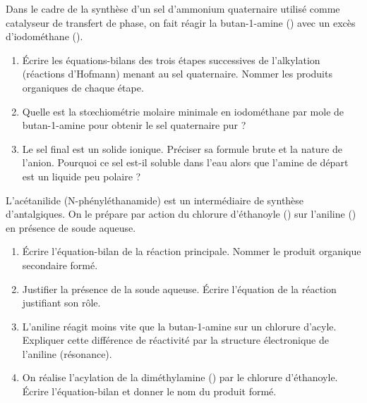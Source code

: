 \documentclass[11pt]{article}
\begin{document}
\begin{exercice}
Dans le cadre de la synthèse d'un sel d'ammonium quaternaire utilisé comme catalyseur de transfert de phase, on fait réagir la butan-1-amine () avec un excès d'iodométhane ().
\begin{enumerate}
    \item Écrire les équations-bilans des trois étapes successives de l'alkylation (réactions d'Hofmann) menant au sel quaternaire. Nommer les produits organiques de chaque étape.
    \item Quelle est la stœchiométrie molaire minimale en iodométhane par mole de butan-1-amine pour obtenir le sel quaternaire pur ?
    \item Le sel final est un solide ionique. Préciser sa formule brute et la nature de l'anion. Pourquoi ce sel est-il soluble dans l'eau alors que l'amine de départ est un liquide peu polaire ?
\end{enumerate}
\end{exercice}

\begin{exercice}
L'acétanilide (N-phényléthanamide) est un intermédiaire de synthèse d'antalgiques. On le prépare par action du chlorure d'éthanoyle () sur l'aniline () en présence de soude aqueuse.
\begin{enumerate}
    \item Écrire l'équation-bilan de la réaction principale. Nommer le produit organique secondaire formé.
    \item Justifier la présence de la soude aqueuse. Écrire l'équation de la réaction justifiant son rôle.
    \item L'aniline réagit moins vite que la butan-1-amine sur un chlorure d'acyle. Expliquer cette différence de réactivité par la structure électronique de l'aniline (résonance).
    \item On réalise l'acylation de la diméthylamine () par le chlorure d'éthanoyle. Écrire l'équation-bilan et donner le nom du produit formé.
\end{enumerate}
\end{exercice}
\end{document}
